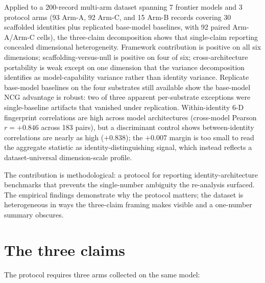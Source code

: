 \documentclass[11pt]{article}
\begin{document}
Applied to a 200-record multi-arm dataset spanning 7 frontier models and 3 protocol arms (93 Arm-A, 92 Arm-C, and 15 Arm-B records covering 30 scaffolded identities plus replicated base-model baselines, with 92 paired Arm-A/Arm-C cells), the three-claim decomposition shows that single-claim reporting concealed dimensional heterogeneity. Framework contribution is positive on all six dimensions; scaffolding-versus-null is positive on four of six; cross-architecture portability is weak except on one dimension that the variance decomposition identifies as model-capability variance rather than identity variance. Replicate base-model baselines on the four substrates still available show the base-model NCG advantage is robust: two of three apparent per-substrate exceptions were single-baseline artifacts that vanished under replication. Within-identity 6-D fingerprint correlations are high across model architectures (cross-model Pearson $r = +0.846$ across 183 pairs), but a discriminant control shows between-identity correlations are nearly as high ($+0.838$); the $+0.007$ margin is too small to read the aggregate statistic as identity-distinguishing signal, which instead reflects a dataset-universal dimension-scale profile.

The contribution is methodological: a protocol for reporting identity-architecture benchmarks that prevents the single-number ambiguity the re-analysis surfaced. The empirical findings demonstrate why the protocol matters; the dataset is heterogeneous in ways the three-claim framing makes visible and a one-number summary obscures.

\section{The three claims}
\label{sec:claims}

The protocol requires three arms collected on the same model:
\end{document}
